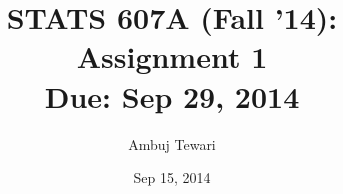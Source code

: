 \usepackage{fullpage}
\usepackage{amsmath,amssymb,amsthm}
\usepackage{url}
\usepackage[colorlinks=true]{hyperref}

\newcommand\reals{\mathbb{R}}

\author{Ambuj Tewari}
\title{STATS 607A (Fall '14): Assignment 1\\
Due: Sep 29, 2014}
\date{Sep 15, 2014}
